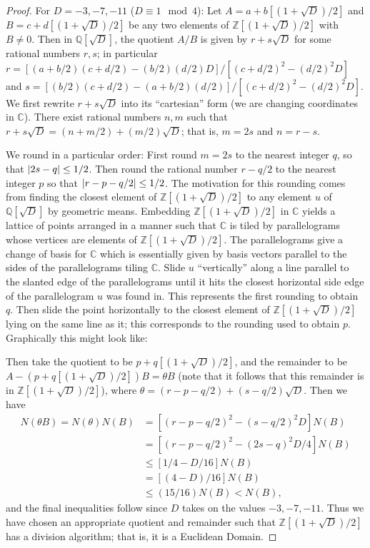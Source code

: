 \documentclass[11pt]{article}
\begin{document}
\begin{enumerate}
\begin{enumerate}[label=(\alph*)]
\begin{proof}
        For $D = -3, -7, -11$ ($D\equiv 1 \mod 4$): Let $A = a+b[(1+\sqrt{D})/2]$ and $B = c+d[(1+\sqrt{D})/2]$ be any two elements of $\mathbb{Z}[(1+\sqrt{D})/2]$ with $B\neq 0$. Then in $\mathbb{Q}[\sqrt{D}]$, the quotient $A/B$ is given by $r+s\sqrt{D}$ for some rational numbers $r,s$; in particular $r = [(a+b/2)(c+d/2)-(b/2)(d/2)D]/[(c+d/2)^2-(d/2)^2D]$ and $s = [(b/2)(c+d/2)-(a+b/2)(d/2)]/[(c+d/2)^2-(d/2)^2D]$. We first rewrite $r+s\sqrt{D}$ into its ``cartesian'' form (we are changing coordinates in $\mathbb{C}$). There exist rational numbers $n,m$ such that $r+s\sqrt{D} = (n+m/2) + (m/2)\sqrt{D}$; that is, $m = 2s$ and $n = r-s$.
        
        We round in a particular order: First round $m = 2s$ to the nearest integer $q$, so that $\abs{2s-q}\leq 1/2$. Then round the rational number $r-q/2$ to the nearest integer $p$ so that $\abs{r-p-q/2}\leq 1/2$. The motivation for this rounding comes from finding the closest element of $\mathbb{Z}[(1+\sqrt{D})/2]$ to any element $u$ of $\mathbb{Q}[\sqrt{D}]$ by geometric means. Embedding $\mathbb{Z}[(1+\sqrt{D})/2]$ in $\mathbb{C}$ yields a lattice of points arranged in a manner such that $\mathbb{C}$ is tiled by parallelograms whose vertices are elements of $\mathbb{Z}[(1+\sqrt{D})/2]$. The parallelograms give a change of basis for $\mathbb{C}$ which is essentially given by basis vectors parallel to the sides of the parallelograms tiling $\mathbb{C}$. Slide $u$ ``vertically'' along a line parallel to the slanted edge of the parallelograms until it hits the closest horizontal side edge of the parallelogram $u$ was found in. This represents the first rounding to obtain $q$. Then slide the point horizontally to the closest element of $\mathbb{Z}[(1+\sqrt{D})/2]$ lying on the same line as it; this corresponds to the rounding used to obtain $p$. Graphically this might look like:
        \vspace*{5cm}

        Then take the quotient to be $p+q[(1+\sqrt{D})/2]$, and the remainder to be $A - (p+q[(1+\sqrt{D})/2])B = \theta B$ (note that it follows that this remainder is in $\mathbb{Z}[(1+\sqrt{D})/2]$), where $\theta = (r-p-q/2) + (s-q/2)\sqrt{D}$. Then we have \begin{align*}
          N(\theta B) = N(\theta)N(B) &= [(r-p-q/2)^2 - (s-q/2)^2D]N(B) \\
          &= [(r-p-q/2)^2 - (2s-q)^2D/4]N(B)\\ 
          &\leq [1/4 - D/16]N(B)\\ 
          &= [(4-D)/16]N(B) \\ 
          &\leq (15/16)N(B) < N(B),
        \end{align*} and the final inequalities follow since $D$ takes on the values $-3,-7,-11$. Thus we have chosen an appropriate quotient and remainder such that $\mathbb{Z}[(1+\sqrt{D})/2]$ has a division algorithm; that is, it is a Euclidean Domain.


\end{proof}
\end{enumerate}
\end{enumerate}
\end{document}

